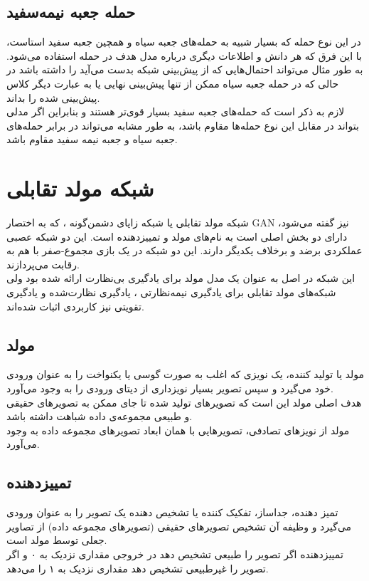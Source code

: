 \subsection{حمله جعبه نیمه‌سفید}
در این نوع حمله که بسیار شبیه به حمله‌های جعبه سیاه و همچین جعبه سفید استاست، با این فرق که هر دانش و اطلاعات دیگری درباره مدل هدف در حمله استفاده می‌شود. به طور مثال می‌تواند احتمال‌هایی که از پیش‌بینی شبکه بدست می‌آید را داشته باشد در حالی که در حمله جعبه سیاه ممکن از تنها پیش‌بینی نهایی یا به عبارت دیگر کلاس پیش‌بینی شده را بداند.
\\
لازم به ذکر است که حمله‌های جعبه سفید بسیار قوی‌تر هستند و بنابراین اگر مدلی بتواند در مقابل این نوع حمله‌ها مقاوم باشد، به طور مشابه می‌تواند در برابر حمله‌های جعبه سیاه و جعبه نیمه سفید مقاوم باشد.


\section{شبکه مولد تقابلی}
شبکه مولد تقابلی یا شبکه زایای دشمن‌گونه
 \cite{Goodfellow2014GenerativeAN}
، که به اختصار GAN نیز گفته می‌شود، دارای دو بخش اصلی است به نام‌های مولد 
و تمییزدهنده
است. این دو شبکه عصبی عملکردی برضد و برخلاف یکدیگر دارند. این دو شبکه در یک بازی مجموع-صفر
با هم به رقابت می‌پردازند.
\\
این شبکه در اصل به عنوان یک مدل مولد
  برای یادگیری بی‌نظارت 
ارائه شده بود ولی شبکه‌های مولد تقابلی برای یادگیری نیمه‌نظارتی
، یادگیری نظارت‌شده
و یادگیری تقویتی
نیز کاربردی اثبات شده‌اند.

\subsection{مولد}
مولد یا تولید کننده، یک نویزی که اغلب به صورت گوسی
 یا یکنواخت 
 را به عنوان ورودی خود می‌گیرد و سپس تصویر بسیار نویزداری از دیتای ورودی را به وجود می‌آورد.
\\
هدف اصلی مولد این است که تصویر‌های تولید شده تا جای ممکن به تصویر‌های حقیقی و طبیعی مجموعه‌ی داده شباهت داشته باشد.
\\
مولد از نویز‌های تصادفی، تصویر‌هایی با همان ابعاد تصویر‌های مجموعه داده به وجود می‌آورد.

\subsection{تمییز‌دهنده}
تمیز دهنده، جداساز، تفکیک کننده یا تشخیص دهنده یک تصویر را به عنوان ورودی می‌گیرد و وظیفه آن تشخیص تصویر‌های حقیقی (تصویر‌های مجموعه داده) از تصاویر جعلی توسط مولد است.
\\
تمییزدهنده اگر تصویر را طبیعی تشخیص دهد در خروجی مقداری نزدیک به ۰ و اگر تصویر را غیرطبیعی تشخیص دهد مقداری نزدیک به ۱ را می‌دهد.

